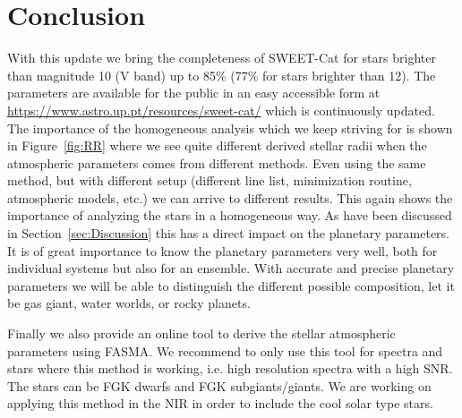\documentclass{aa}
\begin{document}
\section{Conclusion}
\label{sec:conclusion}

With this update we bring the completeness of SWEET-Cat for stars brighter than
magnitude 10 (V band) up to 85\% (77\% for stars brighter than 12). The
parameters are available for the public in an easy accessible form at
\url{https://www.astro.up.pt/resources/sweet-cat/} which is continuously
updated. The importance of the homogeneous analysis which we keep striving for
is shown in Figure~\ref{fig:RR} where we see quite different derived stellar
radii when the atmospheric parameters comes from different methods. Even using
the same method, but with different setup (different line list, minimization
routine, atmospheric models, etc.) we can arrive to different results. This
again shows the importance of analyzing the stars in a homogeneous way. As have
been discussed in Section~\ref{sec:Discussion} this has a direct impact on the
planetary parameters. It is of great importance to know the planetary parameters
very well, both for individual systems but also for an ensemble. With accurate
and precise planetary parameters we will be able to distinguish the different
possible composition, let it be gas giant, water worlds, or rocky planets.

Finally we also provide an online tool to derive the stellar atmospheric
parameters using FASMA. We recommend to only use this tool for spectra and stars
where this method is working, i.e. high resolution spectra with a high SNR. The
stars can be FGK dwarfs and FGK subgiants/giants. We are working on applying
this method in the NIR in order to include the cool solar type stars.
\end{document}
